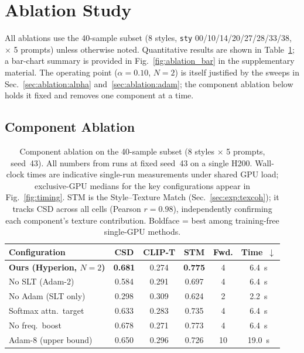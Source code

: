 \section{Ablation Study}
\label{sec:ablation}

All ablations use the 40-sample subset (8 styles, \texttt{sty}
00/10/14/20/27/28/33/38, $\times$ 5 prompts) unless otherwise noted.
Quantitative results are shown in Table~\ref{tab:ablation}; a bar-chart
summary is provided in Fig.~\ref{fig:ablation_bar} in the supplementary
material.
The operating point ($\alpha{=}0.10$, $N{=}2$) is itself justified by the
sweeps in Sec.~\ref{sec:ablation:alpha} and~\ref{sec:ablation:adam}; the
component ablation below holds it fixed and removes one component at a time.

\subsection{Component Ablation}
\label{sec:ablation:components}

\begin{table}[t]
  \centering
  \caption{%
    Component ablation on the 40-sample subset (8 styles $\times$ 5 prompts, seed~43).
    All numbers from runs at fixed seed~43 on a single H200.
    Wall-clock times are indicative single-run measurements under shared GPU
    load; exclusive-GPU medians for the key configurations appear in
    Fig.~\ref{fig:timing}.
    STM is the Style--Texture Match (Sec.~\ref{sec:exp:texcoh}); it tracks CSD
    across all cells (Pearson $r{=}0.98$), independently confirming each
    component's texture contribution.
    Boldface = best among training-free single-GPU methods.%
  }
  \label{tab:ablation}
  \footnotesize
  \begin{tabular}{lccccc}
    \toprule
    Configuration & CSD & CLIP-T & STM & Fwd. & Time~$\downarrow$ \\
    \midrule
    \rowcolor{tabshade!10}
    \textbf{Ours (Hyperion, $N{=}2$)} & \textbf{0.681} & 0.274 & \textbf{0.775} & 4  & 6.4~s \\
    No SLT (Adam-2)                 & 0.584 & 0.291 & 0.697 & 4  & 6.4~s \\
    No Adam (SLT only)              & 0.298 & 0.309 & 0.624 & 2  & 2.2~s \\
    Softmax attn.\ target           & 0.633 & 0.283 & 0.735 & 4  & 6.4~s \\
    No freq.\ boost                 & 0.678 & 0.271 & 0.773 & 4  & 6.4~s \\
    Adam-8 (upper bound)            & 0.650 & 0.296 & 0.726 & 10 & 19.0~s \\
    \bottomrule
  \end{tabular}
\end{table}

